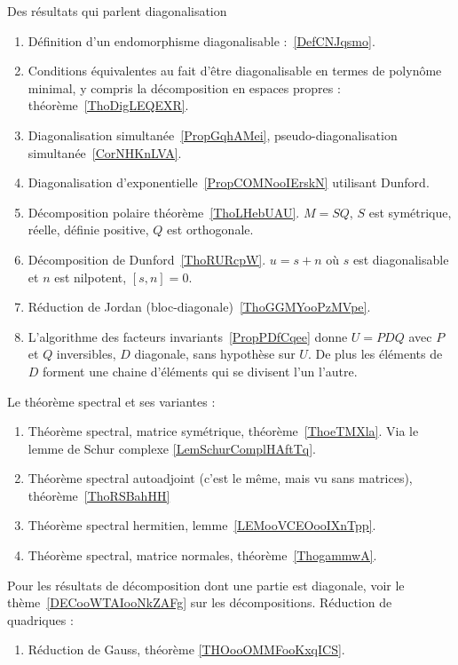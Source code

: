     Des résultats qui parlent diagonalisation
    \begin{enumerate}
        \item
            Définition d'un endomorphisme diagonalisable :~\ref{DefCNJqsmo}.
        \item
            Conditions équivalentes au fait d'être diagonalisable en termes de polynôme minimal, y compris la décomposition en espaces propres : théorème~\ref{ThoDigLEQEXR}.
        \item
            Diagonalisation simultanée~\ref{PropGqhAMei}, pseudo-diagonalisation simultanée~\ref{CorNHKnLVA}.
        \item
            Diagonalisation d'exponentielle~\ref{PropCOMNooIErskN} utilisant Dunford.
        \item
            Décomposition polaire théorème~\ref{ThoLHebUAU}. \( M=SQ\), \( S\) est symétrique, réelle, définie positive, \( Q\) est orthogonale.
        \item
            Décomposition de Dunford~\ref{ThoRURcpW}. \( u=s+n\) où \( s\) est diagonalisable et \( n\) est nilpotent, \( [s,n]=0\).
        \item
            Réduction de Jordan (bloc-diagonale)~\ref{ThoGGMYooPzMVpe}.
        \item
            L'algorithme des facteurs invariants~\ref{PropPDfCqee} donne \( U=PDQ\) avec \( P\) et \( Q\) inversibles, \( D\) diagonale, sans hypothèse sur \( U\). De plus les éléments de \( D\) forment une chaine d'éléments qui se divisent l'un l'autre.
        \end{enumerate}
        Le théorème spectral et ses variantes :
        \begin{enumerate}
            \item
                Théorème spectral, matrice symétrique, théorème~\ref{ThoeTMXla}. Via le lemme de Schur complexe \ref{LemSchurComplHAftTq}.
            \item
                Théorème spectral autoadjoint (c'est le même, mais vu sans matrices), théorème~\ref{ThoRSBahHH}
            \item
                Théorème spectral hermitien, lemme~\ref{LEMooVCEOooIXnTpp}.
            \item
                Théorème spectral, matrice normales, théorème~\ref{ThogammwA}.
            \end{enumerate}
        Pour les résultats de décomposition dont une partie est diagonale, voir le thème~\ref{DECooWTAIooNkZAFg} sur les décompositions.
        Réduction de quadriques : 
        \begin{enumerate}
            \item
                Réduction de Gauss, théorème \ref{THOooOMMFooKxqICS}.
        \end{enumerate}


